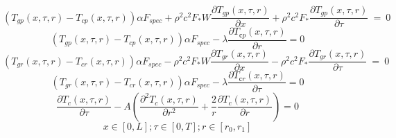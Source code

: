 \documentclass[a4paper,12pt]{article}
\begin{document}
 $$(T_{gp}(x,\tau,r) - T_{cp}(x,\tau,r)) \alpha F_{spec} + \rho^2 c^2 F_* W\frac{\partial T_{gp}(x,\tau,r)}{\partial x} + \rho^2 c^2 F_*\frac{\partial T_{gp}(x,\tau,r)}{\partial \tau}~=~0$$
$$(T_{gp}(x,\tau,r) - T_{cp}(x,\tau,r))\alpha F_{spec} - \lambda \frac{\partial T_{сp}(x,\tau,r)}{\partial r} = 0$$
$$(T_{gr}(x,\tau,r) - T_{cr}(x,\tau,r)) \alpha F_{spec} - \rho^2 c^2 F_* W\frac{\partial T_{gr}(x,\tau,r)}{\partial x} - \rho^2 c^2 F_*\frac{\partial T_{gr}(x,\tau,r)}{\partial \tau}~=~0$$
$$(T_{gr}(x,\tau,r) - T_{cr}(x,\tau,r))\alpha F_{spec} -  \lambda \frac{\partial T_{сr}(x,\tau,r)}{\partial \tau} = 0$$
$$\frac{\partial T_{c}(x,\tau,r)}{\partial \tau} - A\left(\frac{\partial^2 T_{c}(x,\tau,r)}{\partial r^2} + \frac{2}{r} \frac{\partial T_{c}(x,\tau,r)}{\partial r}\right) = 0$$
$$x \in [0, L]; \tau \in [0, T]; r \in [r_0,r_1]$$
 
  
  
\end{document}
